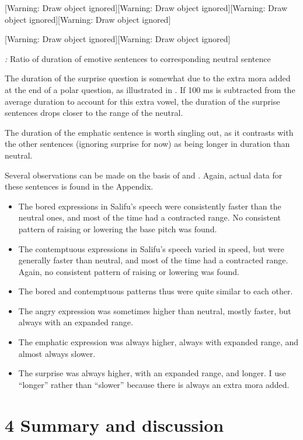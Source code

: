 \documentclass[output=paper]{langsci/langscibook}
\begin{document}
[Warning: Draw object ignored][Warning: Draw object ignored][Warning: Draw object ignored][Warning: Draw object ignored]

[Warning: Draw object ignored][Warning: Draw object ignored]

\emph{\textup{:}} Ratio of duration of emotive sentences to corresponding neutral sentence

The duration of the surprise question is somewhat due to the extra mora added at the end of a polar question, as illustrated in . If 100 ms is subtracted from the average duration to account for this extra vowel, the duration of the surprise sentences drops closer to the range of the neutral. 

The duration of the emphatic sentence is worth singling out, as it contrasts with the other sentences (ignoring surprise for now) as being longer in duration than neutral. 

Several observations can be made on the basis of  and . Again, actual data for these sentences is found in the Appendix.

\begin{itemize}
\item The bored expressions in Salifu’s speech were consistently faster than the neutral ones, and most of the time had a contracted range. No consistent pattern of raising or lowering the base pitch was found.
\item The contemptuous expressions in Salifu’s speech varied in speed, but were generally faster than neutral, and most of the time had a contracted range. Again, no consistent pattern of raising or lowering was found.
\item The bored and contemptuous patterns thus were quite similar to each other.
\item The angry expression was sometimes higher than neutral, mostly faster, but always with an expanded range.
\item The emphatic expression was always higher, always with expanded range, and almost always slower.
\item The surprise was always higher, with an expanded range, and longer. I use “longer” rather than “slower” because there is always an extra mora added.
\end{itemize}
\chapter{4 Summary and discussion}
\end{document}
